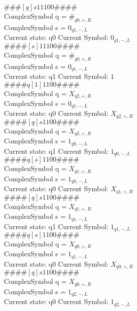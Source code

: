 \documentclass[10pt, a4paper]{article}
\begin{document}
$\# \#\# [ q ] s 1 1 1 0 0 \# \# \# \# $ \\
ComplexSymbol q = $\#_{q0,+,R}$ \\
ComplexSymbol s = $0_{q1,-,L}$ \\ 
 \medskip
Current state: q0	 Current Symbol: 	 $0_{q1,-,L}$\\
$\# \#\# \# [ s ] 1 1 1 0 0 \# \# \# \# $ \\
ComplexSymbol q = $\#_{q0,+,R}$ \\
ComplexSymbol s = $0_{q1,-,L}$ \\ 
 \medskip
Current state: q1	 Current Symbol: 	 $1$\\
$\# \#\# \# q [ 1 ] 1 1 0 0 \# \# \# \# $ \\
ComplexSymbol q = $X_{q2,+,R}$ \\
ComplexSymbol s = $0_{q1,-,L}$ \\ 
 \medskip
Current state: q0	 Current Symbol: 	 $X_{q2,+,R}$\\
$\# \#\# \# [ q ] s 1 1 0 0 \# \# \# \# $ \\
ComplexSymbol q = $X_{q2,+,R}$ \\
ComplexSymbol s = $1_{q0,-,L}$ \\ 
 \medskip
Current state: q1	 Current Symbol: 	 $1_{q0,-,L}$\\
$\# \#\# \# q [ s ] 1 1 0 0 \# \# \# \# $ \\
ComplexSymbol q = $X_{q1,+,R}$ \\
ComplexSymbol s = $1_{q0,-,L}$ \\ 
 \medskip
Current state: q0	 Current Symbol: 	 $X_{q1,+,R}$\\
$\# \#\# \# [ q ] s 1 1 0 0 \# \# \# \# $ \\
ComplexSymbol q = $X_{q1,+,R}$ \\
ComplexSymbol s = $1_{q1,-,L}$ \\ 
 \medskip
Current state: q1	 Current Symbol: 	 $1_{q1,-,L}$\\
$\# \#\# \# q [ s ] 1 1 0 0 \# \# \# \# $ \\
ComplexSymbol q = $X_{q0,+,R}$ \\
ComplexSymbol s = $1_{q1,-,L}$ \\ 
 \medskip
Current state: q0	 Current Symbol: 	 $X_{q0,+,R}$\\
$\# \#\# \# [ q ] s 1 1 0 0 \# \# \# \# $ \\
ComplexSymbol q = $X_{q0,+,R}$ \\
ComplexSymbol s = $1_{q2,-,L}$ \\ 
 \medskip
Current state: q0	 Current Symbol: 	 $1_{q2,-,L}$\\
\end{document}
